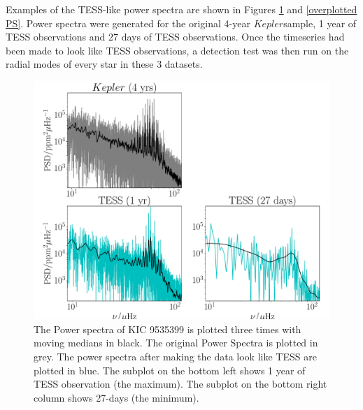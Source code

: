 \documentclass[a4paper,fleqn,usenatbib,useAMS]{mnras}
\newcommand{\kep}{\ensuremath{Kepler}\:}
\begin{document}
Examples of the TESS-like power spectra are shown in Figures \ref{Power Spectra} and \ref{overplotted PS}. Power spectra were generated for the original 4-year \kep sample, 1 year of TESS observations and 27 days of TESS observations. Once the timeseries had been made to look like TESS observations, a detection test was then run on the radial modes of every star in these 3 datasets. 

\begin{figure}
	\centering
	\includegraphics[scale=0.25]{diagnostic_plot3_modes}
	\caption{The Power spectra of KIC 9535399 is plotted three times with moving medians in black. The original Power Spectra is plotted in grey. The power spectra after making the data look like TESS are plotted in blue. The subplot on the bottom left shows 1 year of TESS observation (the maximum). The subplot on the bottom right column shows 27-days (the minimum).}	
	\label{Power Spectra}
\end{figure} 
\end{document}
